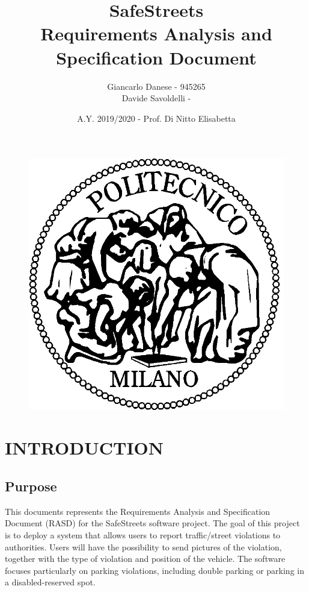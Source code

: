 \documentclass[12pt,a4paper]{article}
\author{Giancarlo Danese - 945265 \\
Davide Savoldelli - }
\date{A.Y. 2019/2020 - Prof. Di Nitto Elisabetta}
\title{
 \textbf{\Huge{SafeStreets}} \\
 \large Requirements Analysis and Specification Document
}
\begin{document}
 \begin{figure}
  \centering
  \includegraphics[width=1.0\linewidth]{images/logo_poli.jpg}
 \end{figure}

 \maketitle
 \newpage
 \tableofcontents
 \newpage

\section{INTRODUCTION}
\subsection{Purpose} 
This documents represents the Requirements Analysis and Specification Document (RASD) for the SafeStreets software project.
The goal of this project is to deploy a system that allows users to report traffic/street violations to authorities. \newline
Users will have the possibility to send pictures of the violation, together with the type of violation and position of the vehicle. The software focuses particularly on parking violations, including double parking or parking in a disabled-reserved spot.
\end{document}
